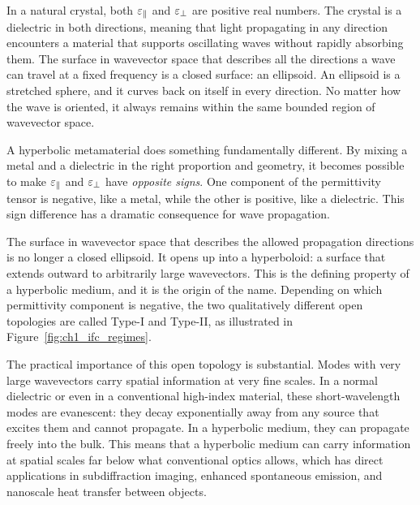 In a natural crystal, both $\varepsilon_{\parallel}$ and $\varepsilon_{\perp}$ are positive real numbers.
The crystal is a dielectric in both directions, meaning that light propagating
in any direction encounters a material that supports oscillating waves without
rapidly absorbing them. The surface in wavevector space that describes all the
directions a wave can travel at a fixed frequency is a closed surface: an
ellipsoid. An ellipsoid is a stretched sphere, and it curves back on itself
in every direction. No matter how the wave is oriented, it always remains
within the same bounded region of wavevector space.

A hyperbolic metamaterial does something fundamentally different. By mixing a
metal and a dielectric in the right proportion and geometry, it becomes
possible to make $\varepsilon_{\parallel}$ and $\varepsilon_{\perp}$ have \emph{opposite signs}. One
component of the permittivity tensor is negative, like a metal, while the
other is positive, like a dielectric. This sign difference has a dramatic
consequence for wave propagation.

The surface in wavevector space that describes the allowed propagation
directions is no longer a closed ellipsoid. It opens up into a hyperboloid: a
surface that extends outward to arbitrarily large wavevectors. This is the
defining property of a hyperbolic medium, and it is the origin of the name.
Depending on which permittivity component is negative, the two qualitatively
different open topologies are called Type-I and Type-II, as illustrated in
Figure~\ref{fig:ch1_ifc_regimes}.

The practical importance of this open topology is substantial. Modes with very
large wavevectors carry spatial information at very fine scales. In a normal
dielectric or even in a conventional high-index material, these short-wavelength
modes are evanescent: they decay exponentially away from any source that
excites them and cannot propagate. In a hyperbolic medium, they can propagate
freely into the bulk. This means that a hyperbolic medium can carry information
at spatial scales far below what conventional optics allows, which has direct
applications in subdiffraction imaging, enhanced spontaneous emission, and
nanoscale heat transfer between objects.

